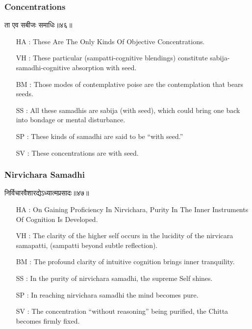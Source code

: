 \begin{frame}[fragile]\frametitle{Concentrations}
\begin{sanskrit}
ता एव सबीजः समाधिः॥४६॥
\end{sanskrit}

	\begin{itemize}
	\item [HA]: These Are The Only Kinds Of Objective Concentrations.
	\item [VH]: These particular (sampatti-cognitive blendings) constitute sabija-samadhi-cognitive absorption with seed.
	\item [BM]: Those modes of contemplative poise are the contemplation that bears seeds.
	\item [SS]: All these samadhis are sabija (with seed), which could bring one back into bondage or mental disturbance.
	\item [SP]: These kinds of samadhi are said to be “with seed.”
	\item [SV]: These concentrations are with seed. 
	\end{itemize}
\end{frame}


\begin{frame}[fragile]\frametitle{Nirvichara Samadhi}
\begin{sanskrit}
निर्विचारवैशारद्येऽध्यात्मप्रसादः॥४७॥
\end{sanskrit}

	\begin{itemize}
	\item [HA]: On Gaining Proficiency In Nirvichara, Purity In The Inner Instruments Of Cognition Is Developed.
	\item [VH]: The clarity of the higher self occurs in the lucidity of the nirvicara samapatti, (sampatti beyond subtle reflection).
	\item [BM]: The profound clarity of intuitive cognition brings inner tranquility.
	\item [SS]: In the purity of nirvichara samadhi, the supreme Self shines.
	\item [SP]: In reaching nirvichara samadhi the mind becomes pure.
	\item [SV]: The concentration “without reasoning” being purified, the Chitta becomes firmly fixed.
	\end{itemize}
\end{frame}




